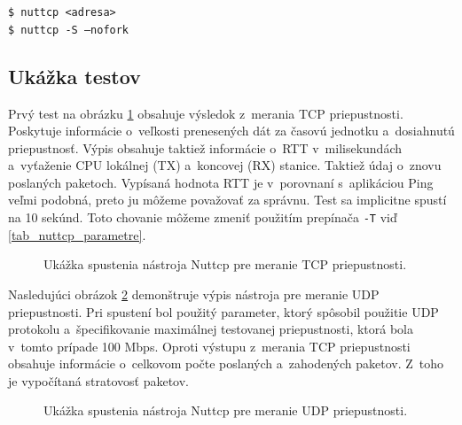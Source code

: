         \begin{flushleft}
            \texttt{\$ nuttcp <adresa>} \\
            \texttt{\$ nuttcp -S --nofork}
        \end{flushleft}

       \subsection{Ukážka testov} \label{nuttcp_testy}
        Prvý test na obrázku \ref{nuttcp_tcp} obsahuje výsledok z~merania
        TCP priepustnosti. Poskytuje informácie o~veľkosti prenesených 
        dát za časovú jednotku a~dosiahnutú priepustnosť. Výpis obsahuje taktiež
        informácie o~RTT v~milisekundách a~vyťaženie CPU lokálnej (TX)
        a~koncovej (RX) stanice. Taktiež údaj o~znovu poslaných paketoch.
        Vypísaná hodnota RTT je v~porovnaní s~aplikáciou Ping
        veľmi podobná, preto ju môžeme považovať za správnu. Test sa implicitne 
        spustí na 10 sekúnd. Toto chovanie môžeme zmeniť použitím prepínača
        \texttt{-T} viď \ref{tab_nuttcp_parametre}.

       \begin{figure}[H]
           \begin{center}
                   \caption{Ukážka spustenia nástroja Nuttcp pre meranie TCP
                   priepustnosti.}
               \label{nuttcp_tcp}
           \end{center}
       \end{figure}
        
       Nasledujúci obrázok \ref{nuttcp_udp} demonštruje výpis nástroja pre
       meranie UDP priepustnosti. Pri spustení bol použitý parameter, ktorý
       spôsobil použitie UDP protokolu a~špecifikovanie maximálnej 
       testovanej priepustnosti, ktorá bola v~tomto prípade 100 Mbps.
       Oproti výstupu z~merania TCP priepustnosti
       obsahuje informácie o~celkovom počte poslaných a~zahodených paketov. 
       Z~toho je vypočítaná stratovosť paketov.

       \begin{figure}[H]
           \begin{center}
                   \caption{Ukážka spustenia nástroja Nuttcp pre meranie UDP
                   priepustnosti.}
               \label{nuttcp_udp}
           \end{center}
       \end{figure}

